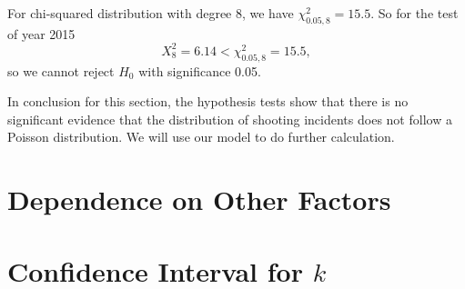 \documentclass[11pt,a4paper,english]{article}
\begin{document}
For chi-squared distribution with degree 8, we have $\chi_{0.05,8}^{2} = 15.5$. So for the test of year 2015
\[X_{8}^{2} = 6.14 < \chi_{0.05,8}^{2} = 15.5,\]
so we cannot reject $H_{0}$ with significance 0.05.

In conclusion for this section, the hypothesis tests show that there is no significant evidence that the distribution of shooting incidents does not follow a Poisson distribution. We will use our model to do further calculation.
\section{Dependence on Other Factors}
\section{Confidence Interval for $k$}
\end{document}
